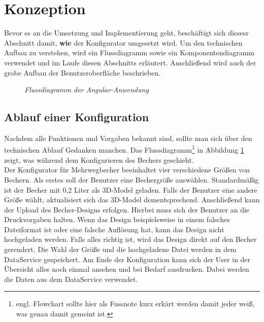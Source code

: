 \section{Konzeption}
\label{sec:konzept}
%
Bevor es an die Umsetzung und Implementierung geht, beschäftigt sich diesesr Abschnitt damit, \textbf{wie} der Konfigurator umgesetzt wird. Um den technischen Aufbau zu verstehen, wird ein Flussdiagramm sowie ein Komponentendiagramm verwendet und im Laufe diesen Abschnitts erläutert. Anschließend wird auch der grobe Aufbau der Benutzeroberfläche beschrieben.\\
\begin{figure}[h]
	\centering
	{}
	\caption[Flussdiagramm]{\textit{Flussdiagramm der Angular-Anwendung}}
	\label{fig:flowchart}
\end{figure}
\subsection{Ablauf einer Konfiguration}
 Nachdem alle Funktionen und Vorgaben bekannt sind, sollte man sich über den technischen Ablauf Gedanken manchen. Das Flussdiagramm\footnote{engl. Flowchart sollte hier als Fussnote kurz erkärt werden damit jeder weiß, was genau damit gemeint ist.} in Abbildung \ref{fig:flowchart} zeigt, was während dem Konfigurieren des Bechers geschieht.\\
 Der Konfigurator für Mehrwegbecher beeinhaltet vier verschiedene Größen von Bechern. Als erstes soll der Benutzer eine Bechergröße auswählen. Standardmäßig ist der Becher mit 0,2 Liter als 3D-Model geladen. Falls der Benutzer eine andere Größe wählt, aktualisiert sich das 3D-Model dementsprechend. Anschließend kann der Upload des Becher-Designs erfolgen. Hierbei muss sich der Benutzer an die Druckvorgaben halten. Wenn das Design beispielsweise in einem falsches Dateiformat ist oder eine falsche Auflösung hat, kann das Design nicht hochgeladen werden. Falls alles richtig ist, wird das Design direkt auf den Becher gerendert. Die Wahl der Größe und die hochgeladene Datei werden in dem DataService gespeichert. Am Ende der Konfiguration kann sich der User in der Übersicht alles noch einmal ansehen und bei Bedarf ausdrucken. Dabei werden die Daten aus dem DataService verwendet.  
 
